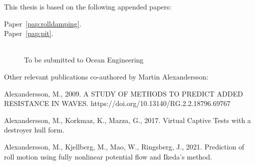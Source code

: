 

This thesis is based on the following appended papers:

\begin{description}
\item[Paper~\ref{pap:rolldamping}.]


\item[Paper~\ref{pap:pit}.] 
\\
To be submitted to Ocean Engineering

\end{description}

\vspace{1cm}

\noindent Other relevant publications co-authored by Martin Alexandersson:
\begin{description}
\normalsize
\newcommand{\ME}{{\bfseries Martin Alexandersson}}

\item
Alexandersson, M., 2009. A STUDY OF METHODS TO PREDICT ADDED RESISTANCE IN WAVES. https://doi.org/10.13140/RG.2.2.18796.69767

\item
Alexandersson, M., Korkmaz, K., Mazza, G., 2017. Virtual Captive Tests with a destroyer hull form.

\item
Alexandersson, M., Kjellberg, M., Mao, W., Ringsberg, J., 2021. Prediction of roll motion using fully nonlinear potential flow and Ikeda’s method.


\end{description}

